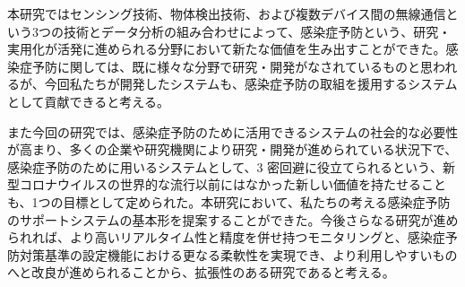 本研究ではセンシング技術、物体検出技術、および複数デバイス間の無線通信という3つの技術とデータ分析の組み合わせによって、感染症予防という、研究・実用化が活発に進められる分野において新たな価値を生み出すことができた。感染症予防に関しては、既に様々な分野で研究・開発がなされているものと思われるが、今回私たちが開発したシステムも、感染症予防の取組を援用するシステムとして貢献できると考える。

また今回の研究では、感染症予防のために活用できるシステムの社会的な必要性が高まり、多くの企業や研究機関により研究・開発が進められている状況下で、感染症予防のために用いるシステムとして、3 密回避に役立てられるという、新型コロナウイルスの世界的な流行以前にはなかった新しい価値を持たせることも、1つの目標として定められた。本研究において、私たちの考える感染症予防のサポートシステムの基本形を提案することができた。今後さらなる研究が進められれば、より高いリアルタイム性と精度を併せ持つモニタリングと、感染症予防対策基準の設定機能における更なる柔軟性を実現でき、より利用しやすいものへと改良が進められることから、拡張性のある研究であると考える。
